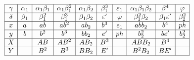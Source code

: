 \documentclass{article}
\begin{document}
\(
\begin{array}{|c|*{13}{c|}}
  \hline
  \gamma & \alpha_1 & \alpha_1\beta_1 & \alpha_1\beta_1^2 & \alpha_1\beta_2 & \beta_1^3 & \varepsilon_1 & \alpha_1\beta_1\beta_2 & \beta^4 & \varphi \\ \hline
  \delta & \beta_1 & \beta_1^2 & \beta_1^3 & \beta_1\beta_2 & \varepsilon' & \varphi & \beta_1^2\beta_2 & \beta_1\varepsilon' & \beta_2^2 \\ \hline
  x & a & ab & ab^2 & ab_2 & b^3 & e_1 & abb_2 & b^4  & ph \\ \hline
  y & b & b^2 & b^3 & bb_2 & e' & ph & b_2^2 & be' & b_2^2 \\ \hline
  X & & AB & AB^2 & AB_2 & B^3 & & ABB_2 & B^4 & \\ \hline
  Y & & B^2 & B^3 & BB_2 & E' & & B^2B_2 & BE' & \\ \hline
\end{array}
\)
\end{document}
